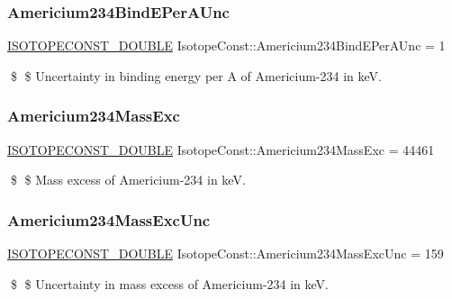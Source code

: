 \subsubsection{\texorpdfstring{Americium234\+Bind\+E\+Per\+A\+Unc}{Americium234BindEPerAUnc}}
{\footnotesize\ttfamily \mbox{\hyperlink{group___isotope_const-_macros_ga8f45a7272ce02c0b4c65c44636ed719a}{I\+S\+O\+T\+O\+P\+E\+C\+O\+N\+S\+T\+\_\+\+D\+O\+U\+B\+LE}} Isotope\+Const\+::\+Americium234\+Bind\+E\+Per\+A\+Unc = 1}

\$ \$ Uncertainty in binding energy per A of Americium-\/234 in keV. \mbox{\label{group___isotope_const-_americium-_am234_gafacebb59f784a271c4dcdea71835296d}} 
\subsubsection{\texorpdfstring{Americium234\+Mass\+Exc}{Americium234MassExc}}
{\footnotesize\ttfamily \mbox{\hyperlink{group___isotope_const-_macros_ga8f45a7272ce02c0b4c65c44636ed719a}{I\+S\+O\+T\+O\+P\+E\+C\+O\+N\+S\+T\+\_\+\+D\+O\+U\+B\+LE}} Isotope\+Const\+::\+Americium234\+Mass\+Exc = 44461}

\$ \$ Mass excess of Americium-\/234 in keV. \mbox{\label{group___isotope_const-_americium-_am234_ga01af407326758c494df9642c43ad253a}} 
\subsubsection{\texorpdfstring{Americium234\+Mass\+Exc\+Unc}{Americium234MassExcUnc}}
{\footnotesize\ttfamily \mbox{\hyperlink{group___isotope_const-_macros_ga8f45a7272ce02c0b4c65c44636ed719a}{I\+S\+O\+T\+O\+P\+E\+C\+O\+N\+S\+T\+\_\+\+D\+O\+U\+B\+LE}} Isotope\+Const\+::\+Americium234\+Mass\+Exc\+Unc = 159}

\$ \$ Uncertainty in mass excess of Americium-\/234 in keV. \mbox{\label{group___isotope_const-_americium-_am234_gaa8f82bf35bb149c3e35e41e57200b8ac}} 
